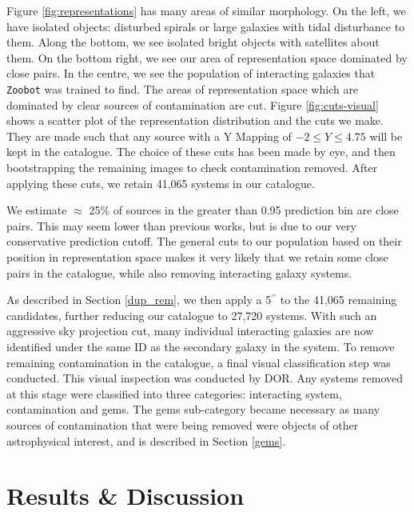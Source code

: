 {Figure \ref{fig:representations} has many areas of similar morphology. On the left, we have isolated objects: disturbed spirals or large galaxies with tidal disturbance to them. Along the bottom, we see isolated bright objects with satellites about them. On the bottom right, we see our area of representation space dominated by close pairs. In the centre, we see the population of interacting galaxies that \texttt{Zoobot} was trained to find. The areas of representation space which are dominated by clear sources of contamination are cut. Figure \ref{fig:cuts-visual} shows a scatter plot of the representation distribution and the cuts we make. They are made such that any source with a Y Mapping of $-2 \leq Y \leq 4.75$ will be kept in the catalogue. The choice of these cuts has been made by eye, and then bootstrapping the remaining images to check contamination removed. After applying these cuts, we retain 41,065 systems in our catalogue.

We estimate $\approx$ 25\% of sources in the greater than 0.95 prediction bin are close pairs. This may seem lower than previous works, but is due to our very conservative prediction cutoff. The general cuts to our population based on their position in representation space makes it very likely that we retain some close pairs in the catalogue, while also removing interacting galaxy systems.

As described in Section \ref{dup_rem}, we then apply a 5$^{\prime \prime}$ to the 41,065 remaining candidates, further reducing our catalogue to 27,720 systems. With such an aggressive sky projection cut, many individual interacting galaxies are now identified under the same ID as the secondary galaxy in the system. To remove remaining contamination in the catalogue, a final visual classification step was conducted. This visual inspection was conducted by DOR. Any systems removed at this stage were classified into three categories: interacting system, contamination and gems. The gems sub-category became necessary as many sources of contamination that were being removed were objects of other astrophysical interest, and is described in Section \ref{gems}.


\section{Results \& Discussion}\label{results}
}

